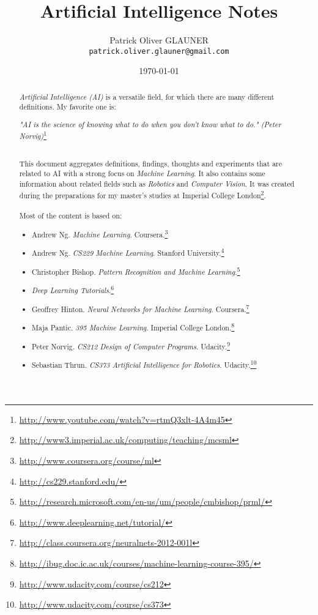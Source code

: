 \documentclass{report}
\title{Artificial Intelligence Notes}
\author{Patrick Oliver GLAUNER \\
	\texttt{patrick.oliver.glauner@gmail.com}}
\date{\today}
\begin{document}
\maketitle

\tableofcontents

\begin{abstract}
{\em Artificial Intelligence (AI)} is a versatile field, for which there are many different definitions. My favorite one is:
\begin{flushright}
{\em "AI is the science of knowing what to do when you don't know what to do." (Peter Norvig)}\footnote{\url{http://www.youtube.com/watch?v=rtmQ3xlt-4A4m45}}
\end{flushright}
~\\
This document aggregates definitions, findings, thoughts and experiments that are related to AI with a strong focus on {\em Machine Learning}. It also contains some information about related fields such as {\em Robotics} and {\em Computer Vision}.
It was created during the preparations for my master's studies at Imperial College London\footnote{\url{http://www3.imperial.ac.uk/computing/teaching/mcsml}}.
~\\~\\
Most of the content is based on:
\begin{itemize}
\item Andrew Ng. {\em Machine Learning}. Coursera.\footnote{\url{http://www.coursera.org/course/ml}}
\item Andrew Ng. {\em CS229 Machine Learning}. Stanford University.\footnote{\url{http://cs229.stanford.edu/}}
\item Christopher Bishop. {\em Pattern Recognition and Machine Learning}.\footnote{\url{http://research.microsoft.com/en-us/um/people/cmbishop/prml/}}
\item {\em Deep Learning Tutorials}.\footnote{\url{http://www.deeplearning.net/tutorial/}}
\item Geoffrey Hinton. {\em Neural Networks for Machine Learning}. Coursera.\footnote{\url{http://class.coursera.org/neuralnets-2012-001l}}
\item Maja Pantic. {\em 395 Machine Learning}. Imperial College London.\footnote{\url{http://ibug.doc.ic.ac.uk/courses/machine-learning-course-395/}}
\item Peter Norvig. {\em CS212 Design of Computer Programs}. Udacity.\footnote{\url{http://www.udacity.com/course/cs212}}
\item Sebastian Thrun. {\em CS373 Artificial Intelligence for Robotics}. Udacity.\footnote{\url{http://www.udacity.com/course/cs373}}

\end{itemize}
\end{abstract}
\end{document}
